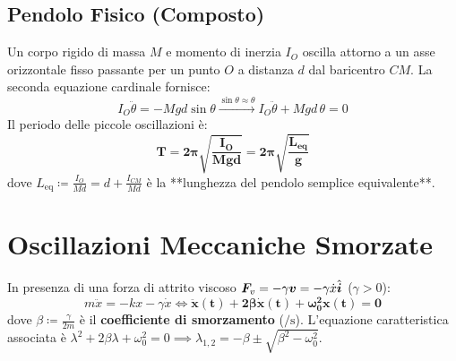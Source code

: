 \subsection{Pendolo Fisico (Composto)}
Un corpo rigido di massa $M$ e momento di inerzia $I_O$ oscilla attorno a un asse orizzontale fisso passante per un punto $O$ a distanza $d$ dal baricentro $CM$.
La seconda equazione cardinale fornisce:
\begin{equation}
    I_O \ddot{\theta} = -M g d \sin\theta \xrightarrow{\sin\theta\approx\theta} I_O \ddot{\theta} + Mgd\,\theta = 0
\end{equation}
Il periodo delle piccole oscillazioni è:
\begin{equation}
    \mathbf{T = 2\pi\sqrt{\frac{I_O}{Mgd}} = 2\pi\sqrt{\frac{L_{\text{eq}}}{g}}}
    \label{eq:pendolo_fisico}
\end{equation}
dove $L_{\text{eq}} \coloneqq \frac{I_O}{Md} = d + \frac{I_{CM}}{Md}$ è la **lunghezza del pendolo semplice equivalente**.

\section{Oscillazioni Meccaniche Smorzate}
\label{sec:oscillazioni_smorzate}

In presenza di una forza di attrito viscoso $\bm{F}_v = -\gamma\bm{v} = -\gamma\dot{x}\hat{\bm{i}}$ ($\gamma > 0$):
\begin{equation}
    m\ddot{x} = -kx - \gamma\dot{x} \iff \mathbf{\ddot{x}(t) + 2\beta\dot{x}(t) + \omega_0^2 x(t) = 0}
    \label{eq:edo_smorzato}
\end{equation}
dove $\beta \coloneqq \frac{\gamma}{2m}$ è il \textbf{coefficiente di smorzamento} ($\si{\per\second}$). L'equazione caratteristica associata è $\lambda^2 + 2\beta\lambda + \omega_0^2 = 0 \implies \lambda_{1,2} = -\beta \pm \sqrt{\beta^2 - \omega_0^2}$.

\begin{center}
\end{center}

